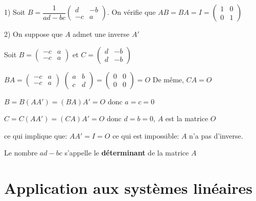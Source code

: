 \documentclass[french]{book}
\begin{document}
\begin{demo}
   
   1) Soit $B=\dfrac{1}{ad-bc}\begin{pmatrix}
    d &-b  \\ 
   -c & a 
   \end{pmatrix}$. On vérifie que $AB=BA=I=\begin{pmatrix}
    1 & 0  \\ 
   0 & 1 
   \end{pmatrix}$
   
   2)  On suppose que $A$ admet une inverse $A'$
   
   Soit $B=\begin{pmatrix}
    -c & a  \\ 
   -c & a 
   \end{pmatrix}$ et $C=\begin{pmatrix}
    d &-b  \\ 
   d & -b 
   \end{pmatrix}$
   
   $BA=\begin{pmatrix}
    -c & a  \\ 
   -c & a 
   \end{pmatrix}$
    $ \begin{pmatrix}
    a & b  \\ 
   c & d 
   \end{pmatrix}=\begin{pmatrix}
    0 & 0  \\ 
   0 & 0
   \end{pmatrix}=O$
   De même, $CA=O$
   
   $B=B(AA')=(BA)A'=O$ donc $a=c=0$
   
   $C=C(AA')=(CA)A'=O$ donc $d=b=0$, $A$ est la matrice $O$ 
   
   ce qui implique que: $AA'=I=O$ ce qui est impossible: $A$ n'a pas d'inverse.\\
  \end{demo} 
   
   \begin{rem}
    Le nombre $ad-bc$ s'appelle le \textbf{déterminant }de la matrice $A$\\
   \end{rem}
   
 \section{Application aux systèmes linéaires}
   
\end{document}
